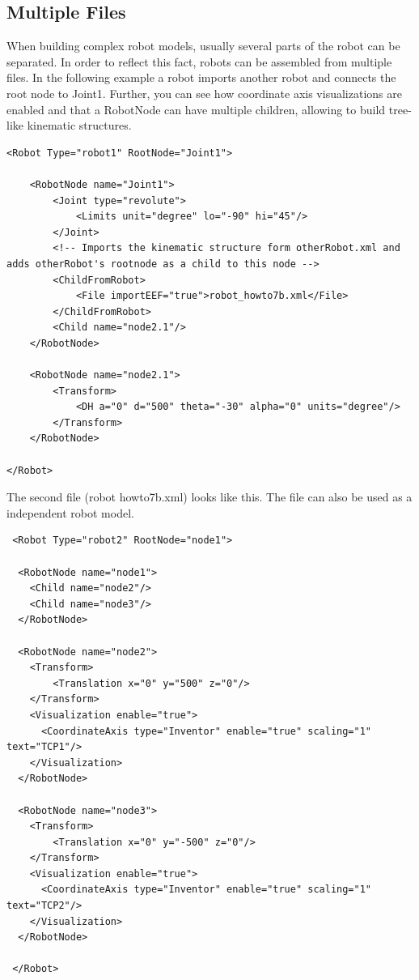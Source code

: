 \subsection{Multiple Files}
\par
When building complex robot models, usually several parts of the robot can be separated. In order to reflect this fact, robots can be assembled from multiple files. In the following example a robot imports another robot and connects the root node to Joint1. Further, you can see how coordinate axis visualizations are enabled and that a RobotNode can have multiple children, allowing to build tree-like kinematic structures. 
\par
\begin{lstlisting}
<Robot Type="robot1" RootNode="Joint1">

    <RobotNode name="Joint1">
        <Joint type="revolute">
            <Limits unit="degree" lo="-90" hi="45"/>
        </Joint>
        <!-- Imports the kinematic structure form otherRobot.xml and adds otherRobot's rootnode as a child to this node -->
        <ChildFromRobot>
            <File importEEF="true">robot_howto7b.xml</File>
        </ChildFromRobot>
        <Child name="node2.1"/>
    </RobotNode>

    <RobotNode name="node2.1">
        <Transform>
            <DH a="0" d="500" theta="-30" alpha="0" units="degree"/>
        </Transform>
    </RobotNode>

</Robot>
\end{lstlisting}
\par
The second file (robot howto7b.xml) looks like this. The file can also be used as a independent robot model. 
 \par
 \begin{lstlisting}
 <Robot Type="robot2" RootNode="node1">
 
  <RobotNode name="node1">
    <Child name="node2"/>
    <Child name="node3"/>
  </RobotNode>
 
  <RobotNode name="node2">
    <Transform>
        <Translation x="0" y="500" z="0"/>
    </Transform>
    <Visualization enable="true">
      <CoordinateAxis type="Inventor" enable="true" scaling="1" text="TCP1"/>
    </Visualization>
  </RobotNode>
 
  <RobotNode name="node3">
    <Transform>
        <Translation x="0" y="-500" z="0"/>
    </Transform>
    <Visualization enable="true">
      <CoordinateAxis type="Inventor" enable="true" scaling="1" text="TCP2"/>
    </Visualization>
  </RobotNode>
 
 </Robot>
 \end{lstlisting}

